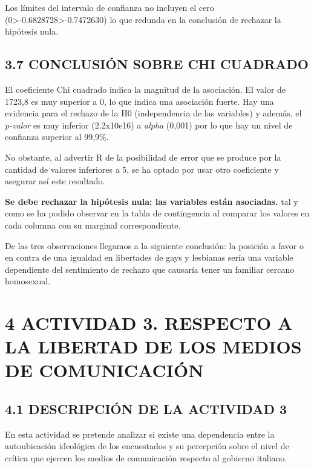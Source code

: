 \documentclass[
  12 pt,
  a4paper,
]{article}
\begin{document}
Los límites del intervalo de confianza no incluyen el cero
(0\textgreater-0.6828728\textgreater-0.7472630) lo que redunda en la
conclusión de rechazar la hipótesis nula.

\subsection{3.7 CONCLUSIÓN SOBRE CHI
CUADRADO}\label{conclusiuxf3n-sobre-chi-cuadrado}

El coeficiente Chi cuadrado indica la magnitud de la asociación. El
valor de 1723,8 es muy superior a 0, lo que indica una asociación
fuerte. Hay una evidencia para el rechazo de la H0 (independencia de las
variables) y además, el \emph{p-valor} es muy inferior (2.2x10e16) a
\emph{alpha} (0,001) por lo que hay un nivel de confianza superior al
99,9\%.

No obstante, al advertir R de la posibilidad de error que se produce por
la cantidad de valores inferiores a 5, se ha optado por usar otro
coeficiente y asegurar así este resultado.

\textbf{Se debe rechazar la hipótesis nula: las variables están
asociadas.} tal y como se ha podido observar en la tabla de contingencia
al comparar los valores en cada columna con su marginal correspondiente.

De las tres observaciones llegamos a la siguiente conclusión: la
posición a favor o en contra de una igualdad en libertades de gays y
lesbianas sería una variable dependiente del sentimiento de rechazo que
causaría tener un familiar cercano homosexual.

\newpage

\section{4 ACTIVIDAD 3. RESPECTO A LA LIBERTAD DE LOS MEDIOS DE
COMUNICACIÓN}\label{actividad-3.-respecto-a-la-libertad-de-los-medios-de-comunicaciuxf3n}

\subsection{4.1 DESCRIPCIÓN DE LA ACTIVIDAD
3}\label{descripciuxf3n-de-la-actividad-3}

En esta actividad se pretende analizar si existe una dependencia entre
la autoubicación ideológica de los encuestados y su percepción sobre el
nivel de crítica que ejercen los medios de comunicación respecto al
gobierno italiano.
\end{document}
